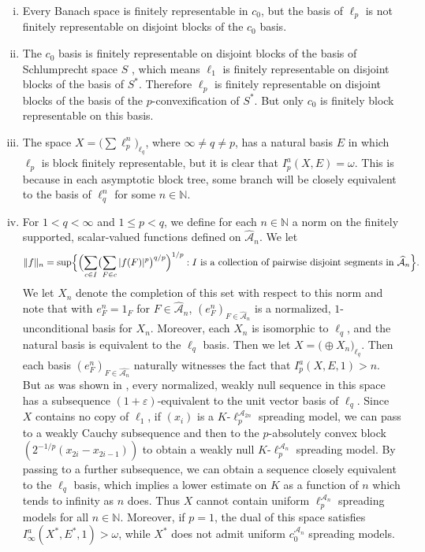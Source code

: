 \documentclass[12pt]{amsart}
\theoremstyle{definition}
\newcommand{\nn}{\mathbb{N}}
\newcommand{\aaa}{\mathcal{A}}
\begin{document}
\begin{enumerate}[(i)]\item Every Banach space is finitely representable in $c_0$, but the basis of $\ell_p$ is not finitely representable on disjoint blocks of the $c_0$ basis.  

\item The $c_0$ basis is finitely representable on disjoint blocks of the basis of Schlumprecht space $S$ \cite{Denka}, which means $\ell_1$ is finitely representable on disjoint blocks of the basis of $S^*$.  Therefore $\ell_p$ is finitely representable on disjoint blocks of the basis of the $p$-convexification of $S^*$.  But only $c_0$ is finitely block representable on this basis.

\item The space $X=\bigl(\sum \ell_p^n\bigr)_{\ell_q}$, where $\infty \neq q\neq p$, has a natural basis $E$ in which $\ell_p$ is block finitely representable, but it is clear that $I^a_p(X, E)=\omega$.  This is because in each asymptotic block tree, some branch will be closely equivalent to the basis of $\ell_q^n$ for some $n\in \nn$.  

\item For $1<q< \infty$ and $1\leqslant p<q$, we define for each $n\in \nn$ a norm on the finitely supported, scalar-valued functions defined on $\widehat{\aaa}_n$.  We let $$\|f\|_n = \sup\Bigl\{\Bigl(\sum_{c\in I}\bigl(\sum_{F\in c}|f(F)|^p\bigr)^{q/p}\Bigr)^{1/p}: I \text{\ is a collection of pairwise disjoint segments in\ }\widehat{\aaa}_n\Bigr\}.$$  We let $X_n$ denote the completion of this set with respect to this norm and note that with $e^n_F= 1_F$ for $F\in \widehat{\aaa}_n$, $(e^n_F)_{F\in \widehat{\aaa}_n}$ is a normalized, $1$-unconditional basis for $X_n$. Moreover, each $X_n$ is isomorphic to $\ell_q$, and the natural basis is equivalent to the $\ell_q$ basis.  Then we let $X=\bigl(\oplus X_n\bigr)_{\ell_q}$.  Then each basis $(e^n_F)_{F\in \widehat{\aaa_n}}$ naturally witnesses the fact that $I^a_p(X, E, 1)>n$.  But as was shown in \cite{Trees and branches}, every normalized, weakly null sequence in this space has a subsequence $(1+\varepsilon)$-equivalent to the unit vector basis of $\ell_q$.  Since $X$ contains no copy of $\ell_1$, if $(x_i)$ is a $K$-$\ell_p^{\aaa_{2n}}$ spreading model, we can pass to a weakly Cauchy subsequence and then to the $p$-absolutely convex block $(2^{-1/p}(x_{2i}-x_{2i-1}))$ to obtain a weakly null $K$-$\ell_p^{\aaa_n}$ spreading model.  By passing to a further subsequence, we can obtain a sequence closely equivalent to the $\ell_q$ basis, which implies a lower estimate on $K$ as a function of $n$ which tends to infinity as $n$ does.  Thus $X$ cannot contain uniform $\ell_p^{\aaa_n}$ spreading models for all $n\in \nn$.  Moreover, if $p=1$, the dual of this space satisfies $I^a_\infty(X^*, E^*,1)>\omega$, while $X^*$ does not admit uniform $c_0^{\aaa_n}$ spreading models.  


\end{enumerate}
\end{document}
